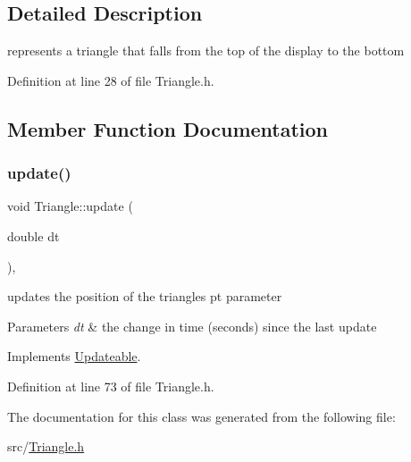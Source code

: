 \subsection{Detailed Description}
represents a triangle that falls from the top of the display to the bottom 

Definition at line 28 of file Triangle.\+h.



\subsection{Member Function Documentation}
\mbox{\label{class_triangle_a38658aaef09315379d75dd9a36456c0e}} 
\subsubsection{\texorpdfstring{update()}{update()}}
{\footnotesize\ttfamily void Triangle\+::update (\begin{DoxyParamCaption}\item[{double}]{dt }\end{DoxyParamCaption})\hspace{0.3cm}{\ttfamily [inline]}, {\ttfamily [virtual]}}



updates the position of the triangle\textquotesingle{}s pt parameter 


\begin{DoxyParams}{Parameters}
{\em dt} & the change in time (seconds) since the last update \\
\hline
\end{DoxyParams}


Implements \mbox{\hyperlink{class_updateable_abf62194ac6d4aca32b21817a0ac20331}{Updateable}}.



Definition at line 73 of file Triangle.\+h.


\begin{DoxyCode}{0}

\end{DoxyCode}


The documentation for this class was generated from the following file\+:\begin{DoxyCompactItemize}
\item 
src/\mbox{\hyperlink{_triangle_8h}{Triangle.\+h}}\end{DoxyCompactItemize}

